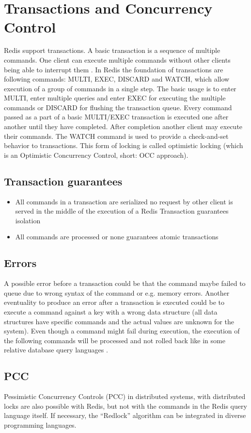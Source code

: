 \chapter{Transactions and Concurrency Control}

Redis support transactions. A basic transaction is a sequence of multiple commands. One client can execute multiple commands without other clients being able to interrupt them \cite{redis_labs_transactions}. In Redis the foundation of transactions are following commands: MULTI, EXEC, DISCARD and WATCH, which allow execution of a group of commands in a single step. The basic usage is to enter MULTI, enter multiple queries and enter EXEC for executing the multiple commands or  DISCARD for flushing the transaction queue. Every command passed as a part of a basic MULTI/EXEC transaction is executed one after another until they have completed. After completion another client may execute their commands. The WATCH command is used to provide a check-and-set behavior to transactions. This form of locking is called optimistic locking (which is an Optimistic Concurrency Control, short: OCC approach).

\section{Transaction guarantees}
\begin{itemize}
	\item All commands in a transaction are serialized no request by other client is served in the middle of the execution of a Redis Transaction guarantees isolation
	\item All commands are processed or none guarantees atomic transactions
\end{itemize}

\section{Errors}
A possible error before a transaction could be that the command maybe failed to queue due to wrong syntax of the command or e.g. memory errors. Another eventuality to produce an error after a transaction is executed could be to execute a command against a key with a wrong data structure (all data structures have specific commands and the actual values are unknown for the system). Even though a command might fail during execution, the execution of the following commands will be processed and not rolled back like in some relative database query languages \cite{redis_transactions}.

\section{PCC}
Pessimistic Concurrency Controls (PCC) in distributed systems, with distributed locks are also possible with Redis, but not with the commands in the Redis query language itself. If necessary, the “Redlock” algorithm can be integrated in diverse programming languages.
